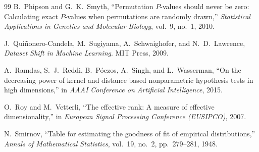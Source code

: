\documentclass[11pt,a4paper]{article}
\theoremstyle{definition}
\begin{document}
\begin{thebibliography}{99}
B.~Phipson and G.~K.~Smyth,
``Permutation $P$-values should never be zero: Calculating exact $P$-values when permutations are randomly drawn,''
\emph{Statistical Applications in Genetics and Molecular Biology}, vol.~9, no.~1, 2010.

J.~Qui\~{n}onero-Candela, M.~Sugiyama, A.~Schwaighofer, and N.~D.~Lawrence,
\emph{Dataset Shift in Machine Learning}.
MIT Press, 2009.

A.~Ramdas, S.~J.~Reddi, B.~P\'{o}czos, A.~Singh, and L.~Wasserman,
``On the decreasing power of kernel and distance based nonparametric hypothesis tests in high dimensions,''
in \emph{AAAI Conference on Artificial Intelligence}, 2015.

O.~Roy and M.~Vetterli,
``The effective rank: A measure of effective dimensionality,''
in \emph{European Signal Processing Conference (EUSIPCO)}, 2007.

N.~Smirnov,
``Table for estimating the goodness of fit of empirical distributions,''
\emph{Annals of Mathematical Statistics}, vol.~19, no.~2, pp.~279--281, 1948.

\end{thebibliography}
\endgroup
\end{document}
